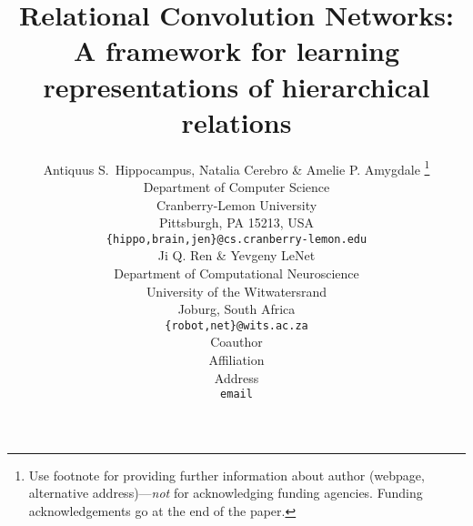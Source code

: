 \documentclass{article}
\title{Relational Convolution Networks: A framework for learning representations of hierarchical relations}
\author{Antiquus S.~Hippocampus, Natalia Cerebro \& Amelie P. Amygdale \thanks{ Use footnote for providing further information
about author (webpage, alternative address)---\emph{not} for acknowledging
funding agencies.  Funding acknowledgements go at the end of the paper.} \\
Department of Computer Science\\
Cranberry-Lemon University\\
Pittsburgh, PA 15213, USA \\
\texttt{\{hippo,brain,jen\}@cs.cranberry-lemon.edu} \\
\And
Ji Q. Ren \& Yevgeny LeNet \\
Department of Computational Neuroscience \\
University of the Witwatersrand \\
Joburg, South Africa \\
\texttt{\{robot,net\}@wits.ac.za} \\
\AND
Coauthor \\
Affiliation \\
Address \\
\texttt{email}
}
\begin{document}
\maketitle













% 



\medskip

\clearpage
{%



}

\clearpage
\appendix

\end{document}

